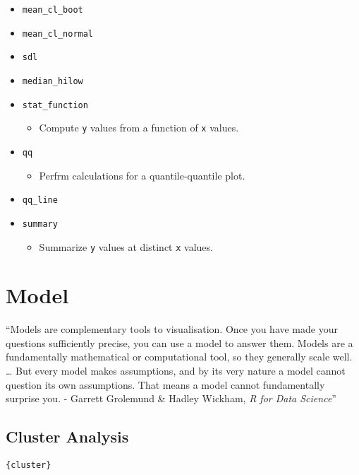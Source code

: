 \documentclass[
]{book}
\providecommand{\tightlist}{%
  \setlength{\itemsep}{0pt}\setlength{\parskip}{0pt}}
\begin{document}
\begin{itemize}
\tightlist
\item
  \texttt{mean\_cl\_boot}
\item
  \texttt{mean\_cl\_normal}
\item
  \texttt{sdl}
\item
  \texttt{median\_hilow}
\item
  \texttt{stat\_function}

  \begin{itemize}
  \tightlist
  \item
    Compute \texttt{y} values from a function of \texttt{x} values.
  \end{itemize}
\item
  \texttt{qq}

  \begin{itemize}
  \tightlist
  \item
    Perfrm calculations for a quantile-quantile plot.
  \end{itemize}
\item
  \texttt{qq\_line}
\item
  \texttt{summary}

  \begin{itemize}
  \tightlist
  \item
    Summarize \texttt{y} values at distinct \texttt{x} values.
  \end{itemize}
\end{itemize}

\hypertarget{model}{%
\chapter{Model}\label{model}}

``Models are complementary tools to visualisation. Once you have made your questions sufficiently precise, you can use a model to answer them. Models are a fundamentally mathematical or computational tool, so they generally scale well. \ldots{} But every model makes assumptions, and by its very nature a model cannot question its own assumptions. That means a model cannot fundamentally surprise you.
- Garrett Grolemund \& Hadley Wickham, \emph{R for Data Science}''

\hypertarget{cluster-analysis}{%
\section{Cluster Analysis}\label{cluster-analysis}}

\texttt{\{cluster\}}
\end{document}
